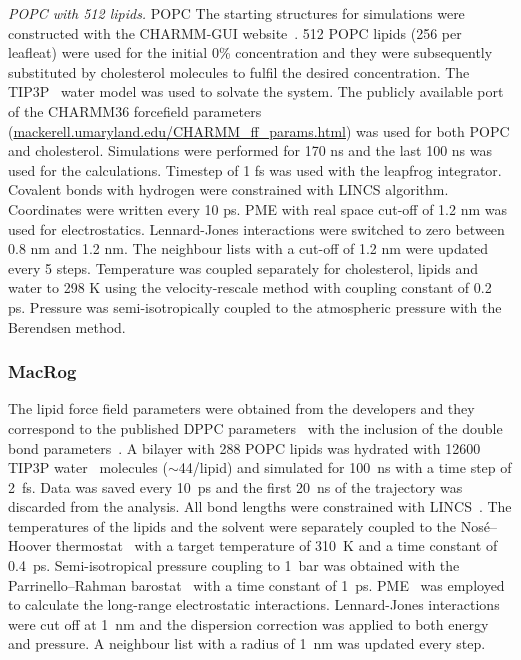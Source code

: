 \documentclass[journal=jacsat,manuscript=article]{achemso}
\begin{document}
{\it POPC with 512 lipids.}
%
POPC The starting structures for simulations were constructed with
the CHARMM-GUI website~\cite{jo08}. 512 POPC lipids (256 per leafleat) were 
used for the initial 0\% concentration and they were subsequently 
substituted by cholesterol molecules to fulfil the desired concentration.
The TIP3P~\cite{jorgensen83} water model was used to solvate the system. 
The publicly available port of the CHARMM36 forcefield parameters (\url{mackerell.umaryland.edu/CHARMM_ff_params.html}) 
was used for both POPC and cholesterol. 
Simulations were performed for 170 ns and the last 100 ns was used for the calculations.
Timestep of 1 fs was used with the leapfrog integrator. Covalent bonds with hydrogen 
were constrained with LINCS algorithm. Coordinates were written every 10 ps.
PME with real space cut-off of 1.2 nm was used for electrostatics. Lennard-Jones 
interactions were switched to zero between 0.8 nm and 1.2 nm. The neighbour lists with a
cut-off of 1.2 nm were updated every 5 steps. Temperature was coupled separately for cholesterol, lipids
and water to 298 K using the velocity-rescale method with coupling constant of 0.2 ps.
Pressure was semi-isotropically coupled to the atmospheric pressure with the Berendsen
method.

\subsubsection{MacRog}
The lipid force field parameters were obtained from the developers and they correspond to the published DPPC parameters~\cite{maciejewski14} with the inclusion of the 
double bond parameters~\cite{kulig15}. 
A bilayer with 288 POPC lipids was hydrated with 12600 TIP3P water~\cite{jorgensen83} molecules ($\sim$44/lipid) and simulated for 100~ns with a time step of 2~fs. Data was saved 
every 10~ps and the first 20~ns of the trajectory was discarded from the analysis. 
All bond lengths were constrained with LINCS~\cite{hess97,hess07}. The temperatures of the lipids and the solvent were separately coupled to the Nos\'{e}--Hoover thermostat~\cite{nose84,hoover85} 
with a target temperature of 310~K and a time constant of 0.4~ps. Semi-isotropical pressure coupling to 1~bar was obtained with the Parrinello--Rahman 
barostat~\cite{parrinello81} with a time constant of 1~ps. PME~\cite{darden93,essman95} was employed to calculate the long-range electrostatic interactions. Lennard-Jones interactions were cut off 
at 1~nm and the dispersion correction was applied to both energy and pressure. A neighbour list with a radius of 1~nm was updated every step. 
\end{document}
